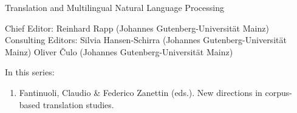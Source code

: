{\large Translation and Multilingual Natural Language Processing}

\bigskip

Chief Editor: Reinhard Rapp (Johannes Gutenberg-Universität Mainz) \\
Consulting Editors: Silvia Hansen-Schirra (Johannes Gutenberg-Universität Mainz)
Oliver Čulo (Johannes Gutenberg-Universität Mainz)

\bigskip

In this series:

\begin{enumerate}
\item Fantinuoli, Claudio \& Federico Zanettin (eds.). New directions in corpus-based translation studies.
\end{enumerate}




